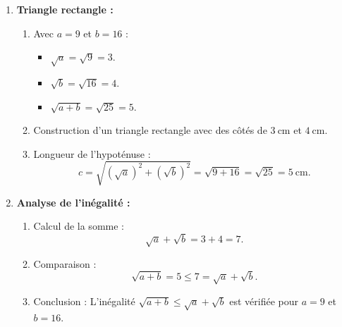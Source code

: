 \documentclass{article}
\begin{document}
\begin{enumerate}
    \item \textbf{Triangle rectangle :}
    \begin{enumerate}
        \item Avec $a = 9$ et $b = 16$ :
        \begin{itemize}
            \item $\sqrt{a} = \sqrt{9} = 3$.
            \item $\sqrt{b} = \sqrt{16} = 4$.
            \item $\sqrt{a + b} = \sqrt{25} = 5$.
        \end{itemize}
        \item Construction d'un triangle rectangle avec des côtés de $3~\text{cm}$ et $4~\text{cm}$.
        \item Longueur de l'hypoténuse :
        \[
        c = \sqrt{(\sqrt{a})^2 + (\sqrt{b})^2} = \sqrt{9 + 16} = \sqrt{25} = 5~\text{cm}.
        \]
    \end{enumerate}
    \item \textbf{Analyse de l'inégalité :}
    \begin{enumerate}
        \item Calcul de la somme :
        \[
        \sqrt{a} + \sqrt{b} = 3 + 4 = 7.
        \]
        \item Comparaison :
        \[
        \sqrt{a + b} = 5 \leq 7 = \sqrt{a} + \sqrt{b}.
        \]
        \item Conclusion : L'inégalité $\sqrt{a + b} \leq \sqrt{a} + \sqrt{b}$ est vérifiée pour $a = 9$ et $b = 16$.
    \end{enumerate}
\end{enumerate}
\end{document}
